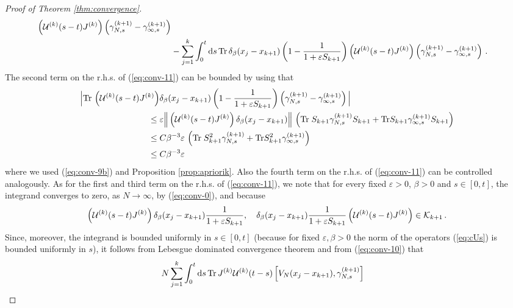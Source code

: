 \documentclass[11pt]{article}
\newcommand{\rd}{{\rm d}}
\newcommand{\e}{\varepsilon}
\newcommand{\cU}{{\cal U}}
\newcommand{\tr}{\mbox{Tr}}
\newcommand{\cK}{{\cal K}}
\begin{document}
\begin{proof}[Proof of Theorem \ref{thm:convergence}]
\begin{equation}
\begin{split}
\left(\cU^{(k)} (s-t) J^{(k)} \right) \left(\gamma_{N,s}^{(k+1)} -
\gamma_{\infty,s}^{(k+1)} \right)
\\ &- \sum_{j=1}^k \int_0^t \rd s \, \tr\,\delta_{\beta} (x_j
-x_{k+1}) \left( 1-\frac{1}{1+\e S_{k+1}}\right) \left(\cU^{(k)}
(s-t) J^{(k)}\right) \left(\gamma_{N,s}^{(k+1)} -
\gamma_{\infty,s}^{(k+1)} \right) \,.
\end{split}
\end{equation}
The second term on the r.h.s. of (\ref{eq:conv-11}) can be bounded
by using that
\begin{equation}
\begin{split}
\Big| \tr \, \left(\cU^{(k)} (s-t) J^{(k)}\right) &\delta_{\beta}
(x_j -x_{k+1}) \left( 1-\frac{1}{1+\e S_{k+1}}\right)
\left(\gamma_{N,s}^{(k+1)} - \gamma_{\infty,s}^{(k+1)} \right)\Big|
\\ \leq \; &\e \Big\| \left(\cU^{(k)} (s-t) J^{(k)}\right)
\delta_{\beta} (x_j -x_{k+1}) \Big\|  \, \left(\tr\; S_{k+1}
\gamma_{N,s}^{(k+1)}S_{k+1} + \tr S_{k+1} \gamma_{\infty,s}^{(k+1)}
S_{k+1} \right) \\ \leq \; &C \beta^{-3} \e \, \left( \tr \;
S_{k+1}^2  \gamma_{N,s}^{(k+1)} + \tr S_{k+1}^2
\gamma_{\infty,s}^{(k+1)} \right)
\\ \leq \; &C \beta^{-3} \e
\end{split}
\end{equation}
where we used (\ref{eq:conv-9b}) and Proposition
\ref{prop:apriorik}. Also the fourth term on the r.h.s. of
(\ref{eq:conv-11}) can be controlled analogously. As for the first
and third term on the r.h.s. of (\ref{eq:conv-11}), we note that for
every fixed $\e >0$, $\beta >0$ and $s \in [0,t]$, the integrand
converges to zero, as $N \to \infty$, by (\ref{eq:conv-0}), and
because \begin{equation}\label{eq:cUs} \left(\cU^{(k)} (s-t)
J^{(k)}\right) \delta_{\beta} (x_j -x_{k+1}) \frac{1}{1+\e S_{k+1}},
\quad \delta_{\beta} (x_j -x_{k+1}) \frac{1}{1+\e S_{k+1}}
\left(\cU^{(k)} (s-t) J^{(k)}\right) \in \cK_{k+1} \, .
\end{equation} Since, moreover, the integrand is bounded uniformly
in $s \in [0,t]$ (because for fixed $\e, \beta >0$ the norm of the
operators (\ref{eq:cUs}) is bounded uniformly in $s$), it follows
from Lebesgue dominated convergence theorem and from
(\ref{eq:conv-10}) that
\begin{equation}\label{eq:conv-12}
\begin{split}
N \sum_{j=1}^k \int_0^t \rd s &\, \tr \, J^{(k)} \cU^{(k)} (t-s)
\left[ V_N (x_j -x_{k+1}) , \gamma_{N,s}^{(k+1)} \right]

\end{split}
\end{equation}
\end{proof}
\end{document}
